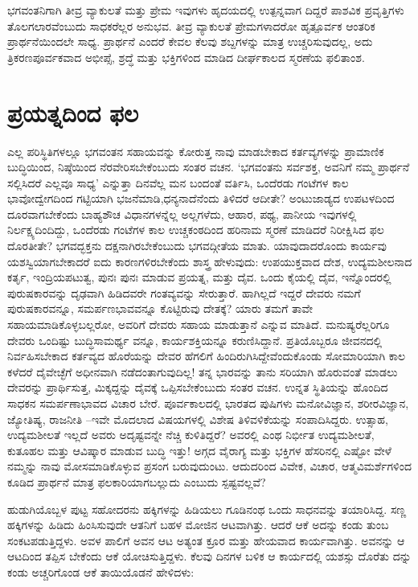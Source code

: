 ಭಗವಂತನಿಗಾಗಿ ತೀವ್ರ ವ್ಯಾಕುಲತೆ ಮತ್ತು ಪ್ರೇಮ ಇವುಗಳು ಹೃದಯದಲ್ಲಿ ಉತ್ಪನ್ನವಾಗ ದಿದ್ದರೆ ಪಾಶವಿಕ ಪ್ರವೃತ್ತಿಗಳು ತೊಲಗಲಾರವೆಂಬುದು ಸಾಧಕರೆಲ್ಲರ ಅನುಭವ. ತೀವ್ರ ವ್ಯಾಕುಲತೆ ಪ್ರೇಮಗಳಾದರೋ ಹೃತ್ಪೂರ್ವಕ ಆಂತರಿಕ ಪ್ರಾರ್ಥನೆಯಿಂದಲೇ ಸಾಧ್ಯ. ಪ್ರಾರ್ಥನೆ ಎಂದರೆ ಕೇವಲ ಕೆಲವು ಶಬ್ದಗಳನ್ನು ಮಾತ್ರ ಉಚ್ಚರಿಸುವುದಲ್ಲ, ಅದು ತ್ರಿಕರಣಪೂರ್ವಕವಾದ ಅಭೀಪ್ಸೆ, ಶ್ರದ್ಧೆ ಮತ್ತು ಭಕ್ತಿಗಳಿಂದ ಮಾಡಿದ ದೀರ್ಘಕಾಲದ ಸ್ಮರಣೆಯ ಫಲಿತಾಂಶ.


\section{ಪ್ರಯತ್ನದಿಂದ ಫಲ}

ಎಲ್ಲ ಪರಿಸ್ಥಿತಿಗಳಲ್ಲೂ ಭಗವಂತನ ಸಹಾಯವನ್ನು ಕೋರುತ್ತ ನಾವು ಮಾಡಬೇಕಾದ ಕರ್ತವ್ಯಗಳನ್ನು ಪ್ರಾಮಾಣಿಕ ಬುದ್ಧಿಯಿಂದ, ನಿಷ್ಠೆಯಿಂದ ನೆರವೇರಿಸಬೇಕೆಂಬುದು ಸಂತರ ವಚನ. ‘ಭಗವಂತನು ಸರ್ವಶಕ್ತ, ಅವನಿಗೆ ನಮ್ಮ ಪ್ರಾರ್ಥನೆ ಸಲ್ಲಿಸಿದರೆ ಎಲ್ಲವೂ ಸಾಧ್ಯ’ ಎನ್ನುತ್ತಾ ದಿನವೆಲ್ಲ ಮನ ಬಂದಂತೆ ವರ್ತಿಸಿ, ಒಂದೆರಡು ಗಂಟೆಗಳ ಕಾಲ ಭಾವೋದ್ವೇಗದಿಂದ ಗಟ್ಟಿಯಾಗಿ ಭಜನೆಮಾಡಿ,ಧನ್ಯನಾದೆನೆಂದು ತಿಳಿದರೆ ಆದೀತೇ? ಅಂಟುಜಾಡ್ಯದ ಉಪಟಳದಿಂದ ದೂರವಾಗಬೇಕೆಂದು ಬಾಹ್ಯಶೌಚ ವಿಧಾನಗಳನ್ನೆಲ್ಲ ಅಲ್ಲಗಳೆದು, ಆಹಾರ, ಪಥ್ಯ, ಪಾನೀಯ ಇವುಗಳಲ್ಲಿ ನಿರ್ಲಕ್ಷ್ಯದಿಂದಿದ್ದು, ಒಂದೆರಡು ಗಂಟೆಗಳ ಕಾಲ ಉಚ್ಚಕಂಠದಿಂದ ಹರಿನಾಮ ಸ್ಮರಣೆ ಮಾಡಿದರೆ ನಿರೀಕ್ಷಿಸಿದ ಫಲ ದೊರತೀತೇ? ಭಗವದ್ಭಕ್ತನು ದಕ್ಷನಾಗಿರಬೇಕೆಂಬುದು ಭಗವದ್ಗೀತೆಯ ಮಾತು. ಯಾವುದಾದರೊಂದು ಕಾರ್ಯವು ಯಶಸ್ವಿಯಾಗಬೇಕಾದರೆ ಐದು ಕಾರಣಗಳಿರಬೇಕೆಂದು ಶಾಸ್ತ್ರ ಹೇಳುವುದು: ಉಪಯುಕ್ತವಾದ ದೇಶ, ಉದ್ಯಮಶೀಲನಾದ ಕರ್ತೃ, ಇಂದ್ರಿಯಪಟುತ್ವ, ಪುನಃ ಪುನಃ ಮಾಡುವ ಪ್ರಯತ್ನ, ಮತ್ತು ದೈವ. ಒಂದು ಕೈಯಲ್ಲಿ ದೈವ, ಇನ್ನೊಂದರಲ್ಲಿ ಪುರುಷಕಾರವನ್ನು ದೃಢವಾಗಿ ಹಿಡಿದವರೇ ಗಂತವ್ಯವನ್ನು ಸೇರುತ್ತಾರೆ. ಹಾಗಿಲ್ಲದೆ ಇದ್ದರೆ ದೇವರು ನಮಗೆ ಪುರುಷಕಾರವನ್ನೂ, ಸಮರ್ಪಣಭಾವವನ್ನೂ ಕೊಟ್ಟಿರುವು ದೇತಕ್ಕೆ? ಯಾರು ತಮಗೆ ತಾವೇ ಸಹಾಯಮಾಡಿಕೊಳ್ಳಬಲ್ಲರೋ, ಅವರಿಗೆ ದೇವರು ಸಹಾಯ ಮಾಡುತ್ತಾನೆ ಎನ್ನುವ ಮಾತಿದೆ. ಮನುಷ್ಯರೆಲ್ಲರಿಗೂ ದೇವರು ಒಂದಿಷ್ಟು ಬುದ್ಧಿಸಾಮರ್ಥ್ಯ ವನ್ನೂ, ಕಾರ್ಯಶಕ್ತಿಯನ್ನೂ ಕರುಣಿಸಿದ್ದಾನೆ. ಪ್ರತಿಯೊಬ್ಬರೂ ಜೀವನದಲ್ಲಿ ನಿರ್ವಹಿಸಬೇಕಾದ ಕರ್ತವ್ಯದ ಹೊರೆಯನ್ನು ದೇವರ ಹೆಗಲಿಗೆ ಹಿಂದಿರುಗಿಸಿದ್ದೇವೆಂದುಕೊಂಡು ಸೋಮಾರಿಯಾಗಿ ಕಾಲ ಕಳೆದರೆ ದೈವೇಚ್ಛೆಗೆ ಅಧೀನವಾಗಿ ನಡೆದಂತಾಗುವುದಿಲ್ಲ! ತನ್ನ ಭಾರವನ್ನು ತಾನು ಸರಿಯಾಗಿ ಹೊರುವಂತೆ ಮಾಡಲು ದೇವರನ್ನು ಪ್ರಾರ್ಥಿಸುತ್ತ, ಮಿಕ್ಕದ್ದನ್ನು ದೈವಕ್ಕೆ ಒಪ್ಪಿಸಬೇಕೆಂಬುದು ಸಂತರ ವಚನ. ಉನ್ನತ ಸ್ಥಿತಿಯನ್ನು ಹೊಂದಿದ ಸಾಧಕನ ಸಮರ್ಪಣಾಭಾವದ ವಿಚಾರ ಬೇರೆ. ಪೂರ್ವಕಾಲದಲ್ಲಿ ಭಾರತದ ಪುಷಿಗಳು ಮನೋವಿಜ್ಞಾನ, ಶರೀರವಿಜ್ಞಾನ, ಜ್ಯೋತಿಷ್ಯ, ರಾಜನೀತಿ –ಇವೇ ಮೊದಲಾದ ವಿಷಯಗಳಲ್ಲಿ ವಿಶೇಷ ತಿಳಿವಳಿಕೆಯನ್ನು ಸಂಪಾದಿಸಿದ್ದರು. ಉತ್ಸಾಹ, ಉದ್ಯಮಶೀಲತೆ ಇಲ್ಲದೆ ಅವರು ಅದೃಷ್ಟವನ್ನೇ ನೆಚ್ಚಿ ಕುಳಿತಿದ್ದರೆ? ಅವರಲ್ಲಿ ಎಂಥ ನಿರ್ಭೀತ ಉದ್ಯಮಶೀಲತೆ, ಕುತೂಹಲ ಮತ್ತು ಆವಿಷ್ಕಾರ ಮಾಡುವ ಬುದ್ಧಿ ಇತ್ತು! ಅಗ್ಗದ ವೈರಾಗ್ಯ ಮತ್ತು ಭಕ್ತಿಗಳ ಹೆಸರಿನಲ್ಲಿ ಎಷ್ಟೋ ವೇಳೆ ನಮ್ಮನ್ನು ನಾವು ಮೋಸಮಾಡಿಕೊಳ್ಳುವ ಪ್ರಸಂಗ ಬರುವುದುಂಟು. ಆದುದರಿಂದ ವಿವೇಕ, ವಿಚಾರ, ಆತ್ಮವಿಮರ್ಶೆಗಳಿಂದ ಕೂಡಿದ ಪ್ರಾರ್ಥನೆ ಮಾತ್ರ ಫಲಕಾರಿಯಾಗಬಲ್ಲುದು ಎಂಬುದು ಸ್ಪಷ್ಟವಲ್ಲವೆ?

ಹುಡುಗಿಯೊಬ್ಬಳ ಪುಟ್ಟ ಸಹೋದರನು ಹಕ್ಕಿಗಳನ್ನು ಹಿಡಿಯಲು ಗೂಡಿನಂಥ ಒಂದು ಸಾಧನವನ್ನು ತಯಾರಿಸಿದ್ದ. ಸಣ್ಣ ಹಕ್ಕಿಗಳನ್ನು ಹಿಡಿದು ಹಿಂಸಿಸುವುದೇ ಆತನಿಗೆ ಬಹಳ ಮೋಜಿನ ಆಟವಾಗಿತ್ತು. ಆದರೆ ಆಕೆ ಅದನ್ನು ಕಂಡು ತುಂಬ ಸಂಕಟಪಡುತ್ತಿದ್ದಳು. ಅವಳ ಪಾಲಿಗೆ ಅವನ ಆಟ ಅತ್ಯಂತ ಕ್ರೂರ ಮತ್ತು ಹೇಯವಾದ ಕಾರ್ಯವಾಗಿತ್ತು. ಅವನನ್ನು ಆ ಆಟದಿಂದ ತಪ್ಪಿಸ ಬೇಕೆಂದು ಆಕೆ ಯೋಚಿಸುತ್ತಿದ್ದಳು. ಕೆಲವು ದಿನಗಳ ಬಳಿಕ ಆ ಕಾರ್ಯದಲ್ಲಿ ಯಶಸ್ಸು ದೊರೆತು ದನ್ನು ಕಂಡು ಅಚ್ಚರಿಗೊಂಡ ಆಕೆ ತಾಯಿಯೊಡನೆ ಹೇಳಿದಳು:

